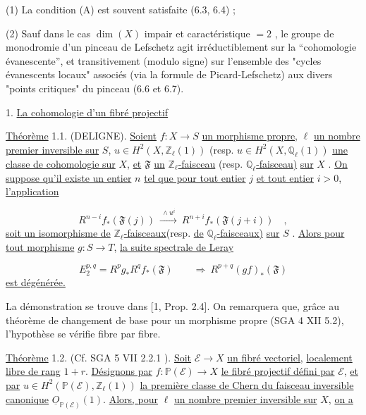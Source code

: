 (1) La condition (A) est souvent satisfaite (6.3, 6.4) ;

(2) Sauf dans le cas $\dim(X)$ impair et caractéristique $= 2$ , le groupe de monodromie d'un pinceau de Lefschetz agit irréductiblement sur la ``cohomologie évanescente'', et transitivement (modulo signe) sur l'ensemble des
"cycles évanescents locaux" associés (via la formule de Picard-Lefschetz) aux divers "points critiques" du pinceau (6.6 et 6.7).


1. \underline{La cohomologie d'un fibré projectif}

\underline{Théorème} 1.1. (DELIGNE). \underline{Soient} $f : X \longrightarrow S$ \underline{un morphisme propre}, $\ell$ \underline{un nombre premier inversible sur} $S$, $u \in H^2(X,\mathbb{Z}_\ell(1))$ (resp. $u \in H^2(X,\mathbb{Q}_\ell(1))$ \underline{une classe de cohomologie sur} $X$, \underline{et} $\mathfrak{F}$ \underline{un} $\mathbb{Z}_\ell$\underline{-faisceau} (resp. $\mathbb{Q}_\ell$\underline{-faisceau)} \underline{sur} $X$ . \underline{On suppose qu'il existe un entier} $n$ \underline{tel que pour tout entier} $j$ \underline{et tout entier} $i > 0$, \underline{l'application}

\begin{equation}\tag{1.1.1}
R^{n-i} f_*(\mathfrak{F}(j)) \ \xrightarrow{\ \wedge u^i\ }\ R^{n+i} f_*(\mathfrak{F}(j+i)) \quad ,
\end{equation}
\underline{soit un isomorphisme de} $\mathbb{Z}_\ell$\underline{-faisceaux}(resp. \underline{de} $\mathbb{Q}_\ell$\underline{-faisceaux)} \underline{sur} $S$ . \underline{Alors pour tout morphisme} $g : S \longrightarrow T$, \underline{la suite spectrale de Leray}

\begin{equation*}
E_2^{p,q} = R^p g_* R^q f_*(\mathfrak{F}) \qquad \Longrightarrow\ R^{p+q}(gf)_*(\mathfrak{F})
\end{equation*}
\underline{est dégénérée.}

La démonstration se trouve dans [1, Prop. 2.4]. On remarquera que, grâce au théorème de changement de base pour un morphisme propre (SGA 4 XII  5.2), l'hypothèse se vérifie fibre par fibre.



\underline{Théorème} 1.2. (Cf. SGA 5 VII 2.2.1 ). \underline{Soit} $\mathcal{E} \longrightarrow X$ \underline{un fibré vectoriel}, \underline{localement libre de rang} $1 + r$. \underline{Désignons par} $f : \mathbb{P}(\mathcal{E}) \longrightarrow X$ \underline{le fibré projectif défini par} $\mathcal{E}$, \underline{et par} $u \in H^2(\mathbb{P}(\mathcal{E}),\mathbb{Z}_\ell(1))$ \underline{la première classe de Chern du faisceau inversible canonique} $\underline{O}_{\mathbb{P}(\mathcal{E})}(1)$. \underline{Alors, pour} $\ell$ \underline{un nombre premier inversible sur} $X$, \underline{on a}

